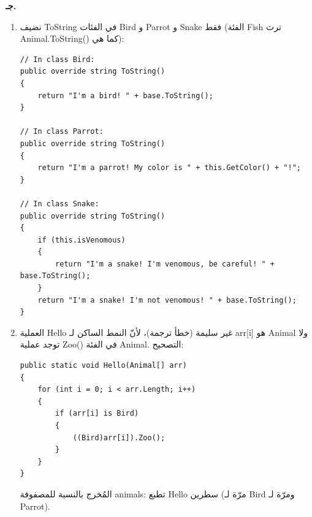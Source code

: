 \begin{boxSolution}
\textbf{جـ.}
\begin{enumerate}[label=\textbf{(\arabic*)}, itemsep=0.5em]
    \item نضيف \textenglish{ToString} في الفئات \textenglish{Bird} و \textenglish{Parrot} و \textenglish{Snake} فقط (الفئة \textenglish{Fish} ترث \textenglish{Animal.ToString()} كما هي):
\begin{boxCode}
\begin{english}
\begin{verbatim}
// In class Bird:
public override string ToString()
{
    return "I'm a bird! " + base.ToString();
}

// In class Parrot:
public override string ToString()
{
    return "I'm a parrot! My color is " + this.GetColor() + "!";
}

// In class Snake:
public override string ToString()
{
    if (this.isVenomous)
    {
        return "I'm a snake! I'm venomous, be careful! " + base.ToString();
    }
    return "I'm a snake! I'm not venomous! " + base.ToString();
}
\end{verbatim}
\end{english}
\end{boxCode}

    \item العملية \textenglish{Hello} غير سليمة (خطأ ترجمة)، لأنّ النمط الساكن لـ \textenglish{arr[i]} هو \textenglish{Animal} ولا توجد عملية \textenglish{Zoo()} في الفئة \textenglish{Animal}. التصحيح:
\begin{boxCode}
\begin{english}
\begin{verbatim}
public static void Hello(Animal[] arr)
{
    for (int i = 0; i < arr.Length; i++)
    {
        if (arr[i] is Bird)
        {
            ((Bird)arr[i]).Zoo();
        }
    }
}
\end{verbatim}
\end{english}
\end{boxCode}
    المُخرج بالنسبة للمصفوفة \textenglish{animals}: تطبع \textenglish{Hello} سطرين (مرّة لـ \textenglish{Bird} ومرّة لـ \textenglish{Parrot}).
\end{enumerate}
\end{boxSolution}
\fi
\filbreak

